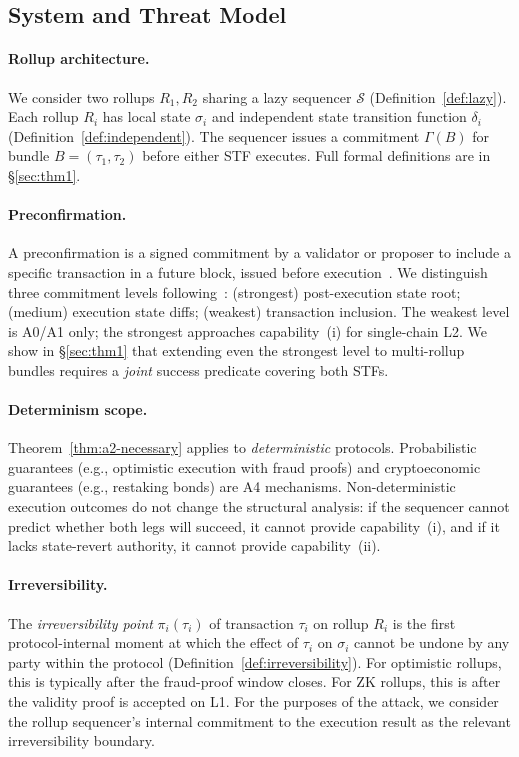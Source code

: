 \subsection{System and Threat Model}
\label{sec:model}

\paragraph{Rollup architecture.}
We consider two rollups $R_1, R_2$ sharing a lazy sequencer $\mathcal{S}$
(Definition~\ref{def:lazy}). Each rollup $R_i$ has local state $\sigma_i$
and independent state transition function $\delta_i$
(Definition~\ref{def:independent}). The sequencer issues a commitment
$\Gamma(B)$ for bundle $B = (\tau_1, \tau_2)$ before either STF executes.
Full formal definitions are in \S\ref{sec:thm1}.

\paragraph{Preconfirmation.}
A preconfirmation is a signed commitment by a validator or proposer to
include a specific transaction in a future block, issued before
execution~\cite{Drake2023-BasedPreconf}. We distinguish three commitment
levels following~\cite{Drake2023-BasedPreconf}: (strongest) post-execution
state root; (medium) execution state diffs; (weakest) transaction inclusion.
The weakest level is A0/A1 only; the strongest approaches capability~(i)
for single-chain L2. We show in \S\ref{sec:thm1} that extending even the
strongest level to multi-rollup bundles requires a \emph{joint} success
predicate covering both STFs.

\paragraph{Determinism scope.}
Theorem~\ref{thm:a2-necessary} applies to \emph{deterministic} protocols.
Probabilistic guarantees (e.g., optimistic execution with fraud proofs) and
cryptoeconomic guarantees (e.g., restaking bonds) are A4 mechanisms.
Non-deterministic execution outcomes do not change the structural analysis:
if the sequencer cannot predict whether both legs will succeed, it cannot
provide capability~(i), and if it lacks state-revert authority, it cannot
provide capability~(ii).

\paragraph{Irreversibility.}
The \emph{irreversibility point} $\pi_i(\tau_i)$ of transaction $\tau_i$
on rollup $R_i$ is the first protocol-internal moment at which the effect
of $\tau_i$ on $\sigma_i$ cannot be undone by any party within the
protocol (Definition~\ref{def:irreversibility}). For optimistic rollups,
this is typically after the fraud-proof window closes. For ZK rollups,
this is after the validity proof is accepted on L1. For the purposes of
the attack, we consider the rollup sequencer's internal commitment to the
execution result as the relevant irreversibility boundary.

